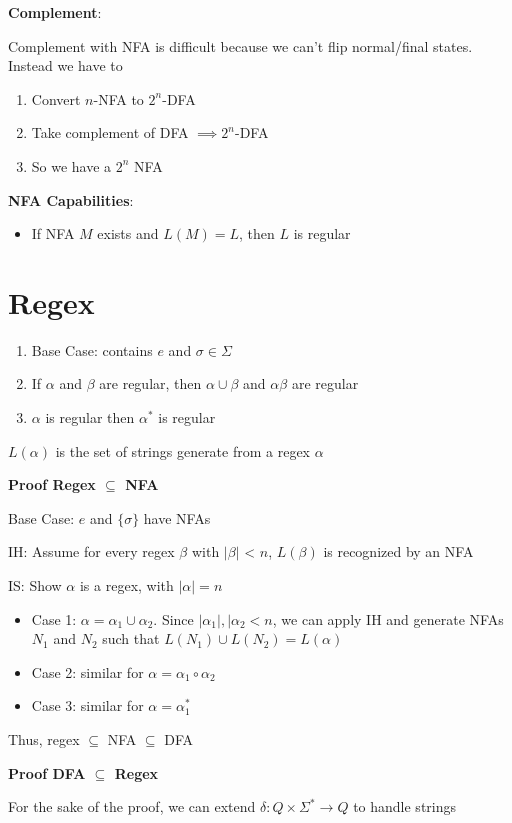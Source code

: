 \documentclass{article}
\begin{document}
  \textbf{Complement}:

    Complement with NFA is difficult because we can't flip normal/final states. Instead we have to
    \begin{enumerate}
      \item Convert $n$-NFA to $2^n$-DFA
      \item Take complement of DFA $\implies 2^n$-DFA
      \item So we have a $2^n$ NFA
    \end{enumerate}
  \textbf{NFA Capabilities}:
  \begin{itemize}
    \item If NFA $M$ exists and $L(M) = L$, then $L$ is regular
  \end{itemize}
  \section{Regex}
  \begin{enumerate}
    \item Base Case: contains $e$ and $\sigma \in \Sigma$
    \item If $\alpha$ and $\beta$ are regular, then $\alpha \cup \beta$ and $\alpha \beta$ are regular
    \item $\alpha$ is regular then $\alpha^*$ is regular
  \end{enumerate}
  $L(\alpha)$ is the set of strings generate from a regex $\alpha$\bigskip

  \textbf{Proof Regex $\subseteq$ NFA}

  Base Case: $e$ and $\{\sigma\}$ have NFAs

  IH: Assume for every regex $\beta$ with $|\beta|$ < $n$, $L(\beta)$ is recognized by an NFA

  IS: Show $\alpha$ is a regex, with $|\alpha| = n$
  \begin{itemize}
    \item Case 1: $\alpha = \alpha_1 \cup \alpha_2$. Since $|\alpha_1|, |\alpha_2 < n$, we can apply IH and generate NFAs $N_1$ and $N_2$ such that $L(N_1) \cup L(N_2) = L(\alpha)$
    \item Case 2: similar for $\alpha = \alpha_1 \circ \alpha_2$
    \item Case 3: similar for $\alpha = \alpha_1^*$
  \end{itemize}
  Thus, regex $\subseteq$ NFA $\subseteq$ DFA \bigskip

  \textbf{Proof DFA $\subseteq$ Regex}

  For the sake of the proof, we can extend $\delta \colon Q \times \Sigma^* \rightarrow Q$ to handle strings
\end{document}
